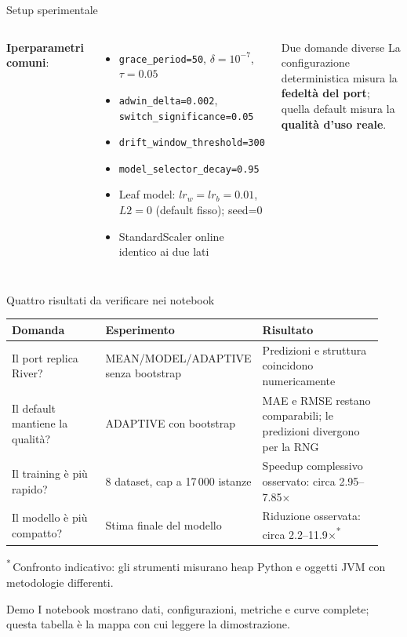 \documentclass[aspectratio=169,10pt]{beamer}
\begin{document}
\begin{frame}{Setup sperimentale}
\begin{columns}[T]
    \vspace{-2pt}
    \textbf{Iperparametri comuni}:
    \begin{itemize}\small
      \item \texttt{grace\_period=50}, $\delta=10^{-7}$, $\tau=0.05$
      \item \texttt{adwin\_delta=0.002}, \texttt{switch\_significance=0.05}
      \item \texttt{drift\_window\_threshold=300}
      \item \texttt{model\_selector\_decay=0.95}
      \item Leaf model: $lr_w=lr_b=0.01$, $L2=0$ (default fisso); seed=0
      \item StandardScaler online identico ai due lati
    \end{itemize}

    \vspace{4pt}
    \begin{alertblock}{Due domande diverse}
      \small
      La configurazione deterministica misura la \textbf{fedeltà del port};
      quella default misura la \textbf{qualità d'uso reale}.
    \end{alertblock}
  \end{columns}
\end{frame}

\begin{frame}{Quattro risultati da verificare nei notebook}
  \footnotesize
  \begin{tabular}{@{}p{0.28\linewidth}p{0.30\linewidth}p{0.36\linewidth}@{}}
    \toprule
    \textbf{Domanda} & \textbf{Esperimento} & \textbf{Risultato} \\
    \midrule
    Il port replica River? &
      MEAN/MODEL/ADAPTIVE senza bootstrap &
      Predizioni e struttura coincidono numericamente \\
    \addlinespace
    Il default mantiene la qualità? &
      ADAPTIVE con bootstrap &
      MAE e RMSE restano comparabili; le predizioni divergono per la RNG \\
    \addlinespace
    Il training è più rapido? &
      8 dataset, cap a 17\,000 istanze &
      Speedup complessivo osservato: circa 2.95--7.85$\times$ \\
    \addlinespace
    Il modello è più compatto? &
      Stima finale del modello &
      Riduzione osservata: circa 2.2--11.9$\times$\textsuperscript{*} \\
    \bottomrule
  \end{tabular}

  \medskip
  {\footnotesize\textsuperscript{*}\,Confronto indicativo: gli strumenti
  misurano heap Python e oggetti JVM con metodologie differenti.}

  \medskip
  \begin{alertblock}{Demo}
    \footnotesize
    I notebook mostrano dati, configurazioni, metriche e curve complete;
    questa tabella è la mappa con cui leggere la dimostrazione.
  \end{alertblock}
\end{frame}
\end{document}

